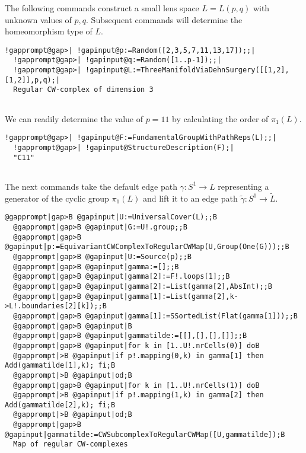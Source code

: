 \documentclass[a4paper,11pt]{report}
\begin{document}
{{The following commands construct a small lens space $L=L(p,q)$ with unknown values of $p,q$. Subsequent commands will determine the homeomorphism type of $L$. 
\begin{Verbatim}[commandchars=!@|,fontsize=\small,frame=single,label=Example]
  !gapprompt@gap>| !gapinput@p:=Random([2,3,5,7,11,13,17]);;|
  !gapprompt@gap>| !gapinput@q:=Random([1..p-1]);;|
  !gapprompt@gap>| !gapinput@L:=ThreeManifoldViaDehnSurgery([[1,2],[1,2]],p,q);|
  Regular CW-complex of dimension 3
  
\end{Verbatim}
 We can readily determine the value of $p=11$ by calculating the order of $\pi_1(L)$. 
\begin{Verbatim}[commandchars=!@|,fontsize=\small,frame=single,label=Example]
  !gapprompt@gap>| !gapinput@F:=FundamentalGroupWithPathReps(L);;|
  !gapprompt@gap>| !gapinput@StructureDescription(F);|
  "C11"
  
\end{Verbatim}
 

 The next commands take the default edge path $\gamma\colon S^1\rightarrow L$ representing a generator of the cyclic group $\pi_1(L)$ and lift it to an edge path $\tilde\gamma\colon S^1\rightarrow \tilde L$. 
\begin{Verbatim}[commandchars=@|B,fontsize=\small,frame=single,label=Example]
  @gapprompt|gap>B @gapinput|U:=UniversalCover(L);;B
  @gapprompt|gap>B @gapinput|G:=U!.group;;B
  @gapprompt|gap>B @gapinput|p:=EquivariantCWComplexToRegularCWMap(U,Group(One(G)));;B
  @gapprompt|gap>B @gapinput|U:=Source(p);;B
  @gapprompt|gap>B @gapinput|gamma:=[];;B
  @gapprompt|gap>B @gapinput|gamma[2]:=F!.loops[1];;B
  @gapprompt|gap>B @gapinput|gamma[2]:=List(gamma[2],AbsInt);;B
  @gapprompt|gap>B @gapinput|gamma[1]:=List(gamma[2],k->L!.boundaries[2][k]);;B
  @gapprompt|gap>B @gapinput|gamma[1]:=SSortedList(Flat(gamma[1]));;B
  @gapprompt|gap>B @gapinput|B
  @gapprompt|gap>B @gapinput|gammatilde:=[[],[],[],[]];;B
  @gapprompt|gap>B @gapinput|for k in [1..U!.nrCells(0)] doB
  @gapprompt|>B @gapinput|if p!.mapping(0,k) in gamma[1] then Add(gammatilde[1],k); fi;B
  @gapprompt|>B @gapinput|od;B
  @gapprompt|gap>B @gapinput|for k in [1..U!.nrCells(1)] doB
  @gapprompt|>B @gapinput|if p!.mapping(1,k) in gamma[2] then Add(gammatilde[2],k); fi;B
  @gapprompt|>B @gapinput|od;B
  @gapprompt|gap>B @gapinput|gammatilde:=CWSubcomplexToRegularCWMap([U,gammatilde]);B
  Map of regular CW-complexes
  
\end{Verbatim}
 

}}
\end{document}
